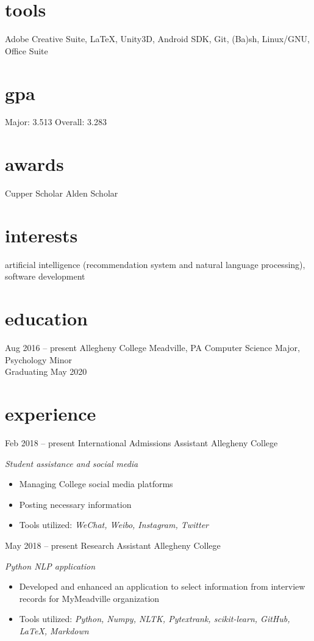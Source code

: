 \documentclass[]{friggeri-cv}
\begin{document}
\begin{aside}
  \section{tools}\vspace{0.05cm}
    Adobe Creative Suite, \LaTeX , Unity3D, Android SDK, Git, (Ba)sh, Linux/GNU, 
    Office Suite
  \section{gpa}\vspace{0.1cm}
  	Major: 3.513
    Overall: 3.283\vspace{0.1cm}
  \section{awards}\vspace{0.05cm}
  Cupper Scholar\vspace{0.1cm}
  Alden Scholar\vspace{0.1cm}
\end{aside}

\section{interests}

artificial intelligence (recommendation system and natural language processing), software development

\section{education}
\begin{entrylist}
  \entry
    {Aug 2016 -- present}
    {Allegheny College}
    {Meadville, PA}
    {Computer Science Major, Psychology Minor\\Graduating May 2020}
\end{entrylist}
\section{experience}
\begin{entrylist}
  \entry
    {Feb 2018 -- present}
    {International Admissions Assistant}
    {Allegheny College}
    {\emph{Student assistance and social media}
    \begin{itemize}[leftmargin=1.2em]
    \item Managing College social media platforms
    \item Posting necessary information
    \item Tools utilized: \emph{WeChat, Weibo, Instagram, Twitter}
    \end{itemize}}
  \entry
    {May 2018 -- present}
    {Research Assistant}
    {Allegheny College}
    {\emph{Python NLP application}
    \begin{itemize}[leftmargin=1.2em]
    \item Developed and enhanced an application to select information from interview records for MyMeadville organization
    \item Tools utilized: \emph{Python, Numpy, NLTK, Pytextrank, scikit-learn, GitHub, \LaTeX, Markdown}
    \end{itemize}}
\end{entrylist}
\end{document}
